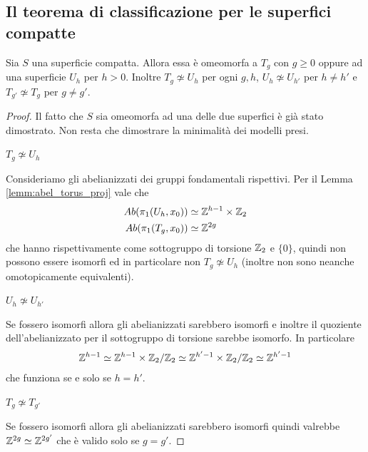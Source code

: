\subsection{\textcolor{TopAlg}{\textbf{Il teorema di classificazione per le superfici compatte}}}
\begin{theorem}
	Sia $S$ una superficie compatta. Allora essa è omeomorfa a $T_g$ con $g\ge 0$ oppure ad una superficie $U_h$ per $h > 0$. Inoltre $T_g \not\simeq U_h$ per ogni $g,h$, $U_h \not\simeq U_{h'}$ per $h\neq h'$ e $T_{g'} \not\simeq T_g$ per $g \neq g'$.
\end{theorem}
\begin{proof}
	Il fatto che $S$ sia omeomorfa ad una delle due superfici è già stato dimostrato. Non resta che dimostrare la minimalità dei modelli presi.\\
	
	\begin{flushleft}
		\textbf{$T_g \not\simeq U_h$}
	\end{flushleft}
	
	Consideriamo gli abelianizzati dei gruppi fondamentali rispettivi. Per il Lemma \ref{lemm:abel_torus_proj} vale che 
	\begin{equation}
	\begin{aligned}
		Ab(\pi_1(U_h, x_0)) & \simeq \mathbb{Z}^{h-1} \times \mathbb{Z}_2 \\
		Ab(\pi_1(T_g, x_0)) & \simeq \mathbb{Z}^{2g}
	\end{aligned}
	\end{equation}
	che hanno rispettivamente come sottogruppo di torsione $\mathbb{Z}_2$ e $\{0\}$, quindi non possono essere isomorfi ed in particolare non $T_g \not\simeq U_h$ (inoltre non sono neanche omotopicamente equivalenti).
	
	\begin{flushleft}
		\textbf{$U_h \not\simeq U_{h'}$}
	\end{flushleft} 
	
	Se fossero isomorfi allora gli abelianizzati sarebbero isomorfi e inoltre il quoziente dell'abelianizzato per il sottogruppo di torsione sarebbe isomorfo. In particolare 
	\begin{equation}
	\begin{aligned}
		\mathbb{Z}^{h-1} \simeq \mathbb{Z}^{h-1} \times \mathbb{Z}_2 / \mathbb{Z}_2 \simeq \mathbb{Z}^{h'-1} \times \mathbb{Z}_2 / \mathbb{Z}_2 \simeq \mathbb{Z}^{h'-1}
	\end{aligned}
	\end{equation}
	che funziona se e solo se $h = h'$.
	
	\begin{flushleft}
		\textbf{$T_g \not\simeq T_{g'}$} 
	\end{flushleft}
	
	Se fossero isomorfi allora gli abelianizzati sarebbero isomorfi quindi valrebbe $\mathbb{Z}^{2g} \simeq \mathbb{Z}^{2g'}$ che è valido solo se $g = g'$.
\end{proof}


